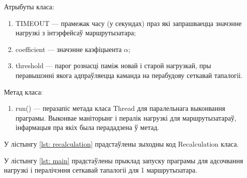 Атрыбуты класа:
\begin{enumerate}
    \item TIMEOUT --- прамежак часу (у секундах) праз які запрашваецца значэнне нагрузкі з інтэрфейсаў маршрутызатара;
    \item coefficient --- значэнне каэфіцыента $\alpha$;
    \item threshold --- парог рознасці паміж новай і старой нагрузкай, пры
    перавышэнні якога адпраўляецца каманда на перабудову сеткавай тапалогіі.
\end{enumerate}

Метад класа:
\begin{enumerate}
    \item run() --- перазапіс метада класа Thread для паралельнага выконвання праграмы. Выконвае маніторынг і пералік нагрузкі для маршрутызатараў, інфармацыя пра якіх была перададзена ў метад.
\end{enumerate}

У лістынгу \ref{lst: recalculation} прадстаўлены зыходны код Recalculation класа.



У лістынгу  \ref{lst: main} прадстаўлены прыклад запуску праграмы для адсочвання
нагрузкі і пералічэння сеткавай тапалогіі для 1 маршрутызатара.



